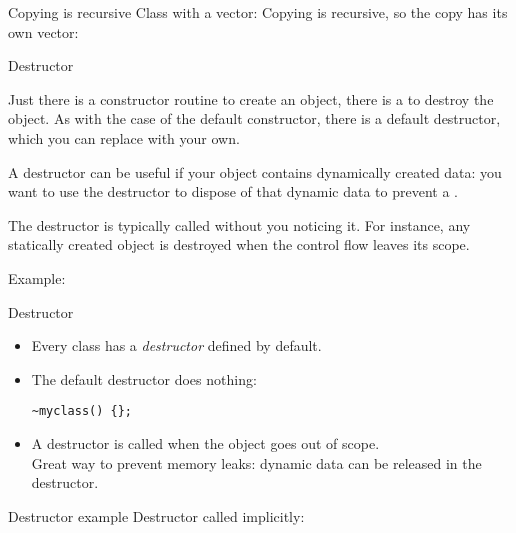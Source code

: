 \begin{block}{Copying is recursive}
  \label{sl:class-copy-vector}
  Class with a vector:
  Copying is recursive, so the copy has its own vector:
\end{block}

 {Destructor}
\label{sec:destructor}

Just there is a constructor routine to create an object, there is a
 to destroy the object.
As with the case of the default constructor, there is a default
destructor, which you can replace with your own.

A destructor can be useful if your object contains dynamically created
data: you want to use the destructor to dispose of that dynamic data
to prevent a .

The destructor is typically called without you noticing it. For
instance, any statically created object is destroyed when the control
flow leaves its scope.

Example:
%

\begin{slide}{Destructor}
  \label{sl:class-destruct}
  \begin{itemize}
  \item Every class  has a \emph{destructor} 
    defined by default.
  \item The default destructor does nothing:
\begin{verbatim}
~myclass() {};
\end{verbatim}
\item A destructor is called when the object goes out of scope.\\
  Great way to prevent memory leaks: dynamic data can be released
  in the destructor.
\end{itemize}
\end{slide}

\begin{slide}{Destructor example}
  \label{sl:class-destruct-ex}
  Destructor called implicitly:
\end{slide}


